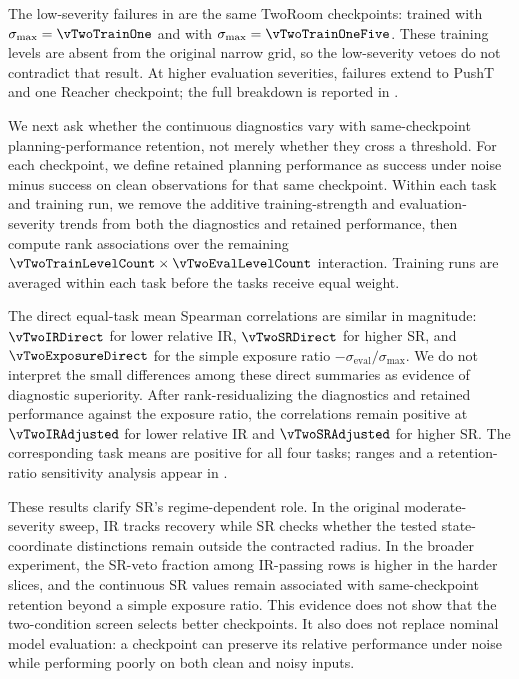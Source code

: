 The low-severity failures in  are the same
\vTwoVetoAtZeroEight{} TwoRoom checkpoints: \vTwoLowVetoAtOne{} trained with
$\sigma_{\max}=\vTwoTrainOne$ and \vTwoLowVetoAtOneFive{} with
$\sigma_{\max}=\vTwoTrainOneFive$. These training levels are absent from the
original narrow grid, so the low-severity vetoes do not contradict that result.
At higher evaluation severities, failures extend to PushT and one Reacher
checkpoint; the full breakdown is reported in
.

We next ask whether the continuous diagnostics vary with same-checkpoint
planning-performance retention, not merely whether they cross a threshold.
For each checkpoint, we define
retained planning performance as success under noise minus success on clean
observations for that same checkpoint. Within each task and training run, we
remove the additive training-strength and evaluation-severity trends from both
the diagnostics and retained performance, then compute rank associations over
the remaining $\vTwoTrainLevelCount\times\vTwoEvalLevelCount$ interaction.
Training runs are averaged within each
task before the \vTwoTaskCount{} tasks receive equal weight.

The direct equal-task mean Spearman correlations are similar in magnitude:
$\vTwoIRDirect$ for lower relative IR, $\vTwoSRDirect$ for higher SR, and
$\vTwoExposureDirect$ for the simple exposure ratio
$-\sigma_{\mathrm{eval}}/\sigma_{\max}$. We do not interpret the small
differences among these direct summaries as evidence of diagnostic superiority.
After rank-residualizing the diagnostics and retained performance against the
exposure ratio, the correlations remain positive at $\vTwoIRAdjusted$ for
lower relative IR and $\vTwoSRAdjusted$ for higher SR. The corresponding task
means are positive for all four tasks; ranges and a retention-ratio sensitivity
analysis appear in .

These results clarify SR's regime-dependent role. In the original
moderate-severity sweep, IR tracks recovery while SR checks whether the tested
state-coordinate distinctions remain outside the contracted radius.
In the broader experiment, the SR-veto fraction among IR-passing rows is higher
in the harder slices, and the continuous SR values remain associated with
same-checkpoint retention beyond a simple exposure ratio. This evidence
does not show that the two-condition screen selects better checkpoints. It also
does not replace nominal model evaluation: a checkpoint can preserve its
relative performance under noise while performing poorly on both clean and
noisy inputs.
\FloatBarrier
